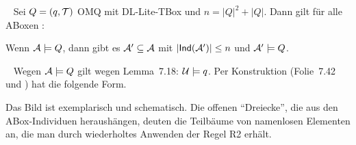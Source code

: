 \documentclass[fontsize=11pt, twoside=false, numbers=autoenddot]{scrbook}
\begin{document}
~
Sei $Q=(q,\mathcal{T})$ OMQ mit DL-Lite-TBox \Tmc und $n = |Q|^2+|Q|$.
Dann gilt für alle ABoxen \Amc:

Wenn $\mathcal{A} \models Q$, dann gibt es $\mathcal{A}' \subseteq \mathcal{A}$
mit $|\textsf{Ind}(\mathcal{A}')| \leq n$ und $\mathcal{A}' \models Q$.

\parII
{}~
Wegen $\mathcal{A} \models Q$ gilt wegen Lemma~7.18: $\mathcal{U} \models q$.
Per Konstruktion (Folie~7.42 und
\textsf{\hyperlink{BspUnivModell}{\BspUnivModell}}) hat \Umc die folgende Form.
%
\begin{center}
\end{center}
%
Das Bild ist exemplarisch und schematisch.
Die offenen "`Dreiecke"', die aus den ABox-Individuen
heraushängen, deuten die Teilbäume von namenlosen Elementen an, die man durch
wiederholtes Anwenden der Regel \textsf{R2} erhält.
\end{document}
